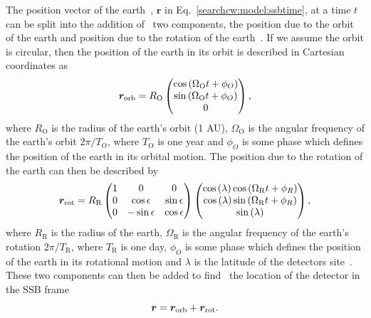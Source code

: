 The position vector of the earth~,
$\bm{r}$ in Eq.~\ref{searchcw:model:ssbtime}, at a time $t$ can be split into
the addition of~ two components,
the position due to the orbit of the earth and position due to the rotation of
the earth~.
If we assume the orbit is circular, then the position of the earth in its orbit
is described in Cartesian coordinates as
%
\begin{equation}
    \bm{r}_{\rm{orb}} = R_{\mathrm{O}}
    \left(
    \begin{matrix}
        \cos{\left( \Omega_{\mathrm{O}} t + \phi_{O}  \right)}  \\
        \sin{\left( \Omega_{\mathrm{O}} t + \phi_{O}  \right)} \\
        0 \\
    \end{matrix} \right),
\end{equation}
%
where $R_{\mathrm{O}}$ is the radius of the earth's orbit (1 AU),
$\Omega_{\mathrm{O}}$ is the angular frequency of the earth's orbit
$2\pi/T_{\mathrm{O}}$, where $T_{\mathrm{O}}$ is one year and $\phi_{O}$ is
some phase which defines the position of the earth in its orbital motion.  The
position due to the rotation of the earth can then be described by 
%
\begin{equation}
    \bm{r}_{\rm{rot}} = R_{\mathrm{R}}
    \left(
    \begin{matrix}
        1 & 0 & 0  \\
        0 & \cos \epsilon & \sin \epsilon \\
        0 & -\sin \epsilon & \cos \epsilon \\
    \end{matrix} \right)
    \left(
    \begin{matrix}
        \cos{(\lambda)}\cos{\left( \Omega_{\mathrm{R}} t + \phi_{R}  \right)}  \\
        \cos{(\lambda)}\sin{\left( \Omega_{\mathrm{R}} t + \phi_{R}  \right)} \\
        \sin{(\lambda)} \\
    \end{matrix} \right),
\end{equation}
%
where $R_{\mathrm{R}}$ is the radius of the earth, $\Omega_{\mathrm{R}}$ is the
angular frequency of the earth's rotation $2\pi/T_{\mathrm{R}}$, where
$T_{\mathrm{R}}$ is one day, $\phi_{O}$ is some phase which defines the
position of the earth in its rotational motion and $\lambda$ is the latitude of
the detectors site~. These two components
can then be added to find~ the location of the detector in the
\gls{SSB} frame
%
\begin{equation}
    \bm{r} = \bm{r}_{\rm{orb}} + \bm{r}_{\rm{rot}}.
\end{equation}


